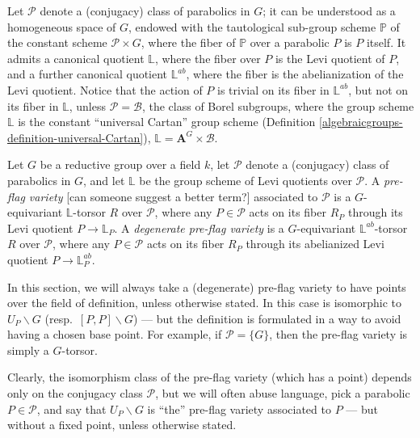 Let $\mathcal P$ denote a (conjugacy) class of parabolics in $G$; it can be understood as a homogeneous space of $G$, endowed with the tautological sub-group scheme $\mathbb P$ of the constant scheme $\mathcal P\times G$, where the fiber of $\mathbb P$ over a parabolic $P$ is $P$ itself. It admits a canonical quotient $\mathbb L$, where the fiber over $P$ is the Levi quotient of $P$, and a further canonical quotient $\mathbb L^{ab}$, where the fiber is the abelianization of the Levi quotient. Notice that the action of $P$ is trivial on its fiber in $\mathbb L^{ab}$, but not on its fiber in $\mathbb L$, unless $\mathcal P = \mathcal B$, the class of Borel subgroups, where the group scheme $\mathbb L$ is the constant ``universal Cartan'' group scheme (Definition \ref{algebraicgroups-definition-universal-Cartan}), $\mathbb L = \mathbf A^G\times \mathcal B$. 

\begin{definition}
 \label{definition-pre-flag}
Let $G$ be a reductive group over a field $k$, let $\mathcal P$ denote a (conjugacy) class of parabolics in $G$, and let $\mathbb L$ be the group scheme of Levi quotients over $\mathcal P$. A {\it pre-flag variety} [can someone suggest a better term?] associated to $\mathcal P$ is a $G$-equivariant $\mathbb L$-torsor $R$ over $\mathcal P$, where any $P\in \mathcal P$ acts on its fiber $R_P$ through its Levi quotient $P\to \mathbb L_P$. A {\it degenerate pre-flag variety} is a $G$-equivariant $\mathbb L^{ab}$-torsor $R$ over $\mathcal P$, where any $P\in \mathcal P$ acts on its fiber $R_P$ through its abelianized Levi quotient $P\to \mathbb L^{ab}_P$.
\end{definition}

\begin{remark}
\label{remark-pre-flag}
In this section, we will always take a (degenerate) pre-flag variety to have points over the field of definition, unless otherwise stated. In this case is isomorphic to $U_P\backslash G$ (resp.\ $[P,P]\backslash G$) --- but the definition is formulated in a way to avoid having a chosen base point. For example, if $\mathcal P=\{G\}$, then the pre-flag variety is simply a $G$-torsor. 

Clearly, the isomorphism class of the pre-flag variety (which has a point) depends only on the conjugacy class $\mathcal P$, but we will often abuse language, pick a parabolic $P \in \mathcal P$, and say that $U_P\backslash G$ is ``the'' pre-flag variety associated to $P$ --- but without a fixed point, unless otherwise stated.
\end{remark}



